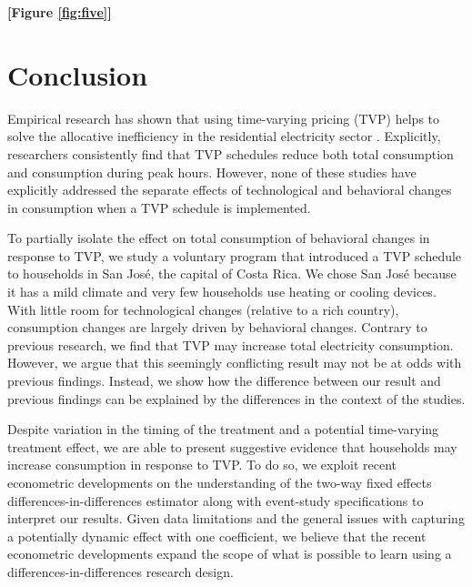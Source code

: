 \documentclass[12pt]{article}
\begin{document}
\centerline{\textbf{[Figure \ref{fig:five}]}}


\section{Conclusion}

Empirical research has shown that using time-varying pricing (TVP) helps to solve the allocative inefficiency in the residential electricity sector \citep{allcottRethinkingRealtimeElectricity2011,wolakResidentialCustomersRespond2011,jessoeUnderstandingRolePrice2014}. Explicitly, researchers consistently find that TVP schedules reduce both total consumption and consumption during peak hours. However, none of these studies have explicitly addressed the separate effects of technological and behavioral changes in consumption when a TVP schedule is implemented.

To partially isolate the effect on total consumption of behavioral changes in response to TVP, we study a voluntary program that introduced a TVP schedule to households in San José, the capital of Costa Rica. We chose San José because it has a mild climate and very few households use heating or cooling devices. With little room for technological changes (relative to a rich country), consumption changes are largely driven by behavioral changes. Contrary to previous research, we find that TVP may increase total electricity consumption. However, we argue that this seemingly conflicting result may not be at odds with previous findings. Instead, we show how the difference between our result and previous findings can be explained by the differences in the context of the studies.

Despite variation in the timing of the treatment and a potential time-varying treatment effect, we are able to present suggestive evidence that households may increase consumption in response to TVP. To do so, we exploit recent econometric developments on the understanding of the two-way fixed effects differences-in-differences estimator \citep{goodman-baconDifferenceinDifferencesVariationTreatment2018} along with event-study specifications to interpret our results. Given data limitations and the general issues with capturing a potentially dynamic effect with one coefficient, we believe that the recent econometric developments expand the scope of what is possible to learn using a differences-in-differences research design.
\end{document}
